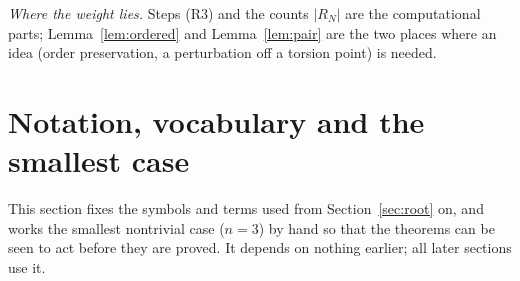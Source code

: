 \documentclass[11pt]{amsart}
\theoremstyle{definition}
\theoremstyle{remark}
\begin{document}
\medskip
\noindent\emph{Where the weight lies.} Steps (R3) and the counts $|R_N|$ are the computational parts; Lemma~\ref{lem:ordered} and Lemma~\ref{lem:pair} are the two places where an idea (order preservation, a perturbation off a torsion point) is needed.

\section{Notation, vocabulary and the smallest case}\label{sec:prelim}

This section fixes the symbols and terms used from Section~\ref{sec:root} on, and works the smallest nontrivial case ($n=3$) by hand so that the theorems can be seen to act before they are proved. It depends on nothing earlier; all later sections use it.
\end{document}
